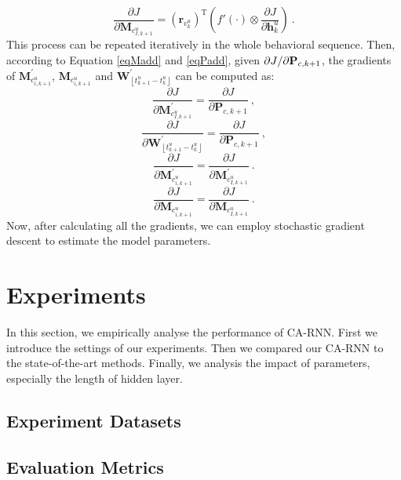 \documentclass{sig-alternate}
\begin{document}
\begin{displaymath}
\frac{{\partial J}}{{\partial {\mathbf{M}_{c^u_{I,k+1}}} }} =  \left({\mathbf{r}_{v^u_k}}\right)^\mathrm{T}\left( {f'\left(  \cdot  \right) \otimes \frac{{\partial J}}{{\partial \mathbf{h}^u_{k} }}} \right) ~.
\end{displaymath}
This process can be repeated iteratively in the whole behavioral sequence. 
Then, according to Equation \eqref{eqMadd} and \eqref{eqPadd}, given ${\partial J \mathord{\left/ \right. \kern-\nulldelimiterspace} {\partial \mathbf{P}_{c,k+1} } }$, the gradients of $\mathbf{M}^{'}_{c^u_{i,k+1}}$, $\mathbf{M}_{c^u_{i,k+1}}$ and $\mathbf{W}^{'}_{\left \lfloor t_{k+1}^{u} - t_{k}^{u} \right \rfloor}$ can be computed as: 
\begin{displaymath}
\frac{{\partial J}}{{\partial {\mathbf{M}^{'}_{c^u_{I,k+1}}} }} =  \frac{\partial J}{\partial \mathbf{P}_{c,k+1}} ~,
\end{displaymath}
\begin{displaymath}
\frac{{\partial J}}{{\partial {\mathbf{W}^{'}_{\left \lfloor t_{k+1}^{u} - t_{k}^{u} \right \rfloor}} }} =  \frac{\partial J}{\partial \mathbf{P}_{c,k+1}} ~,
\end{displaymath}
\begin{displaymath}
\frac{{\partial J}}{{\partial {\mathbf{M}^{'}_{c^u_{i,k+1}}} }} =  \frac{\partial J}{\partial \mathbf{M}^{'}_{c^u_{I,k+1}}} ~.
\end{displaymath}
\begin{displaymath}
\frac{{\partial J}}{{\partial {\mathbf{M}_{c^u_{i,k+1}}} }} =  \frac{\partial J}{\partial \mathbf{M}_{c^u_{I,k+1}}} ~.
\end{displaymath}
Now, after calculating all the gradients, we can employ stochastic gradient descent to estimate the model parameters. 

\section{Experiments}
In this section, we empirically analyse the performance of CA-RNN. First we introduce the settings of our experiments. Then we compared our CA-RNN to the state-of-the-art methods. Finally, we analysis the impact of parameters, especially the length of hidden layer.
\subsection{Experiment Datasets}

\subsection{Evaluation Metrics}
\end{document}
